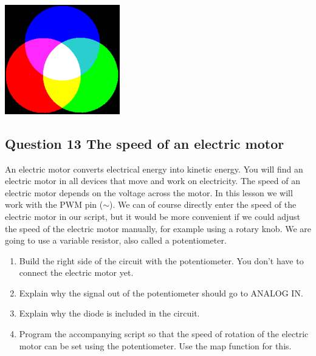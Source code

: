 \documentclass{arduino}
\begin{document}
\begin{center}
\includegraphics[width=5cm]{26. Mixing colours}
\end{center}

\newpage

\subsection{Question 13 The speed of an electric motor}



An electric motor converts electrical energy into kinetic energy. You will find an electric motor in all devices that move and work on electricity. The speed of an electric motor depends on the voltage across the motor. In this lesson we will work with the PWM pin ($\sim$). We can of course directly enter the speed of the electric motor in our script, but it would be more convenient if we could adjust the speed of the electric motor manually, for example using a rotary knob. We are going to use a variable resistor, also called a potentiometer.

\begin{enumerate}[label={\alph*})]
\item Build the right side of the circuit with the potentiometer. You don't have to connect the electric motor yet.

\item Explain why the signal out of the potentiometer should go to ANALOG IN.

\item Explain why the diode is included in the circuit.

\item Program the accompanying script so that the speed of rotation of the electric motor can be set using the potentiometer. Use the map function for this.
\end{enumerate}
\end{document}

